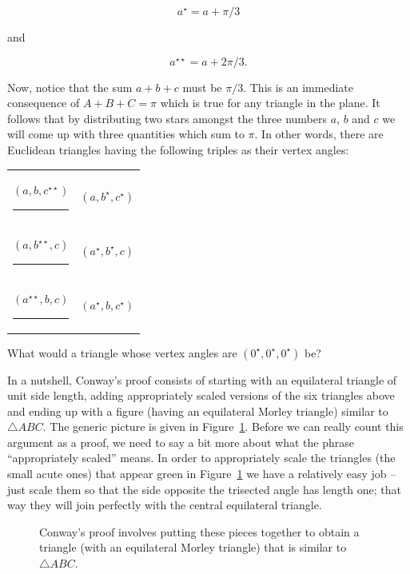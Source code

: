 \[ a^\star = a + \pi/3 \]

\noindent and 

\[ a^{\star\star} = a + 2\pi/3. \]

Now, notice that the sum $a+b+c$ must be $\pi/3$.  This is an 
immediate consequence of $A+B+C=\pi$ which is true for any triangle
in the plane.  It follows that by distributing two stars amongst 
the three numbers $a$, $b$ and $c$ we will come up with three
quantities which sum to $\pi$.  In other words, there are 
Euclidean triangles having the following 
triples as their vertex angles:

\begin{center}
\begin{tabular}{cc}
\rule{0pt}{18pt} $(a, b, c^{\star\star})$ \rule{18pt}{0pt} & $(a, b^\star, c^\star)$ \\
\rule{0pt}{18pt} $(a, b^{\star\star}, c)$ \rule{18pt}{0pt} & $(a^\star, b^\star, c)$ \\
\rule{0pt}{18pt} $(a^{\star\star}, b, c)$ \rule{18pt}{0pt} & $(a^\star, b, c^\star)$ \\
\end{tabular}
\end{center}

\begin{exer}
What would a triangle whose vertex angles are $(0^\star, 0^\star, 0^\star)$
be?
\end{exer}

In a nutshell, Conway's proof consists of starting with an equilateral
triangle of unit side length, adding appropriately scaled versions of the 
six triangles above and ending up with a figure (having an equilateral 
Morley triangle) similar to  ${\triangle}ABC$.  The generic picture is
given in Figure~\ref{fig:morley_conway_puzzle}.  Before we can really
count this argument as a proof, we need to say a bit more about what
the phrase ``appropriately scaled'' means.  In order to appropriately
scale the triangles (the small acute ones) that appear green in Figure~\ref{fig:morley_conway_puzzle}
we have a relatively easy job -- just scale them so that the side
opposite the trisected angle has length one; that way they will join
perfectly with the central equilateral triangle.  
 
\begin{figure}[!hbtp] 
\begin{center}

\end{center}
\caption[Conway's puzzle proof.]{Conway's proof involves putting 
these pieces together to obtain a triangle (with an equilateral
Morley triangle) that is similar to  %
${\triangle}ABC$.}
\label{fig:morley_conway_puzzle}
\end{figure}
  
